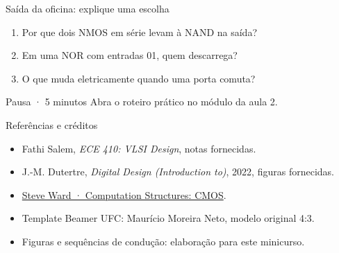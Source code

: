\begin{frame}{Saída da oficina: explique uma escolha}
\begin{enumerate}\item Por que dois NMOS em série levam à NAND na saída?
\item Em uma NOR com entradas 01, quem descarrega?
\item O que muda eletricamente quando uma porta comuta?\end{enumerate}
\end{frame}

\begin{frame}{Pausa · 5 minutos}
\small\centering Abra o roteiro prático no módulo da aula 2.
\end{frame}

\begin{frame}{Referências e créditos}
\small\begin{itemize}\item Fathi Salem, \textit{ECE 410: VLSI Design}, notas fornecidas.
\item J.-M. Dutertre, \textit{Digital Design (Introduction to)}, 2022, figuras fornecidas.
\item \href{https://computationstructures.org/notes/cmos/notes.html}{Steve Ward · Computation Structures: CMOS}.
\item Template Beamer UFC: Maurício Moreira Neto, modelo original 4:3.
\item Figuras e sequências de condução: elaboração para este minicurso.\end{itemize}
\end{frame}

